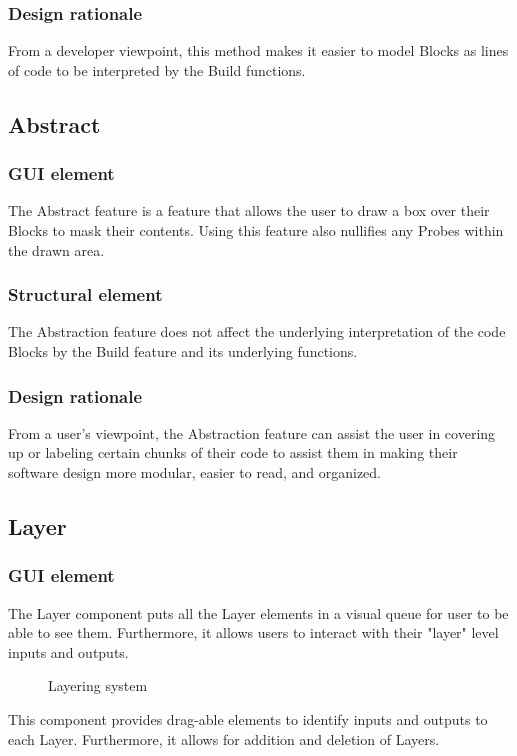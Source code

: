 \documentclass[journal,10pt,onecolumn,compsoc]{IEEEtran} \usepackage[margin=1.0in]{geometry} \usepackage{pdfpages}
\begin{document}
\subsubsection{Design rationale}
\noindent From a developer viewpoint, this method makes it easier to model Blocks as lines of code to be interpreted by the Build functions.
\subsection{Abstract}
\subsubsection{GUI element}
\noindent The Abstract feature is a feature that allows the user to draw a box over their Blocks to mask their contents. 
Using this feature also nullifies any Probes within the drawn area.
\subsubsection{Structural element}
\noindent The Abstraction feature does not affect the underlying interpretation of the code Blocks by the Build feature and its underlying functions.
\subsubsection{Design rationale}
\noindent From a user's viewpoint, the Abstraction feature can assist the user in covering up or labeling certain chunks of their code to assist them in making their software design more modular, easier to read, and organized.
\subsection{Layer}
\subsubsection{GUI element}
\noindent The Layer component puts all the Layer elements in a visual queue for user to be able to see them. Furthermore, it allows users to interact with their "layer" level inputs and outputs.\\
\begin{figure}[H]
\caption{Layering system}
\label{fig:inLayer}
\end{figure}
\noindent This component provides drag-able elements to identify inputs and outputs to each Layer. 
Furthermore, it allows for addition and deletion of Layers.
\end{document}

